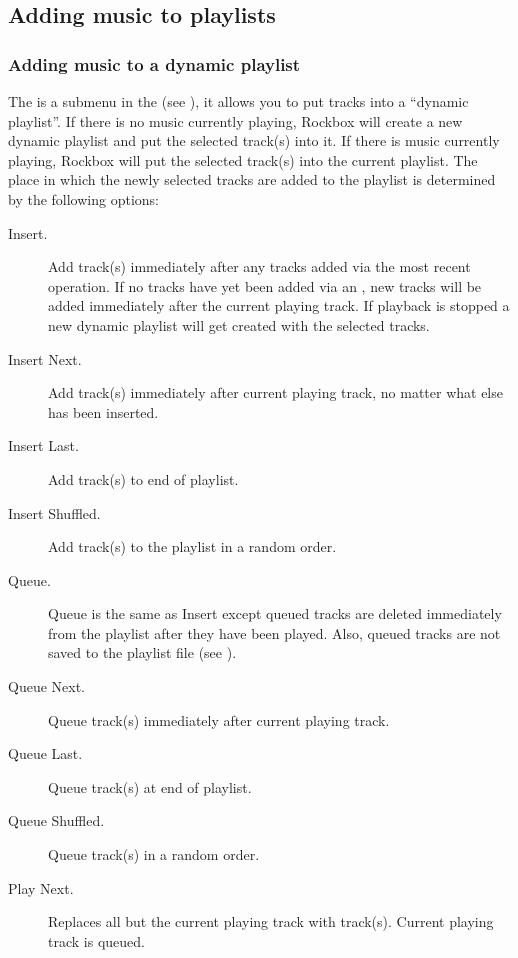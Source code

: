 \subsection{Adding music to playlists}
  
\subsubsection{\label{ref:playlist_submenu}Adding music to a dynamic playlist}
The  is a submenu in the  (see
), it allows you to put tracks into a
``dynamic playlist''. If there is no music currently playing, Rockbox will
create a new dynamic playlist and put the selected track(s) into it.
If there is music currently playing, Rockbox will put the
selected track(s) into the current playlist. The place in which the newly
selected tracks are added to the playlist is determined by the following
options:

\begin{description} 
\item [Insert.] Add track(s) immediately after any tracks added via the most
  recent  operation. If no tracks have yet been added via an
  , new tracks will be added immediately after the current
  playing track. If playback is stopped a new dynamic playlist will get
  created with the selected tracks.
  
\item [Insert Next.] Add track(s) immediately after current playing
  track, no matter what else has been inserted.
  
\item [Insert Last.] Add track(s) to end of playlist.

\item [Insert Shuffled.] Add track(s) to the playlist in a random order.
  
\item [Queue.] Queue is the same as Insert except queued tracks are
  deleted immediately from the playlist after they have been played. Also,
  queued tracks are not saved to the playlist file (see
  ).
  
\item [Queue Next.] Queue track(s) immediately after current playing track.
  
\item [Queue Last.] Queue track(s) at end of playlist.

\item [Queue Shuffled.] Queue track(s) in a random order.

\item [Play Next.] Replaces all but the current playing track with track(s).
    Current playing track is queued.
\end{description}

